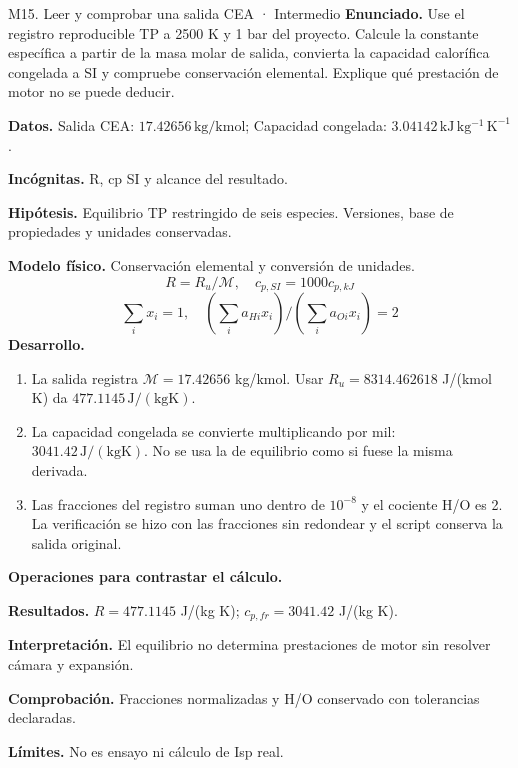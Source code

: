 \begin{studiumworked}{M15. Leer y comprobar una salida CEA · Intermedio}
\textbf{Enunciado.} Use el registro reproducible TP a 2500 K y 1 bar del proyecto. Calcule la constante específica a partir de la masa molar de salida, convierta la capacidad calorífica congelada a SI y compruebe conservación elemental. Explique qué prestación de motor no se puede deducir.

\textbf{Datos.} Salida CEA: $17.42656\,\mathrm{kg/kmol}$; Capacidad congelada: $3.04142\,\mathrm{kJ\,kg^{-1}\,K^{-1}}$.

\textbf{Incógnitas.} R, cp SI y alcance del resultado.

\textbf{Hipótesis.} Equilibrio TP restringido de seis especies. Versiones, base de propiedades y unidades conservadas.

\textbf{Modelo físico.} Conservación elemental y conversión de unidades.
\[R=R_u/\mathcal M,\quad c_{p,SI}=1000c_{p,kJ}\]
\[\sum_i x_i=1,\quad (\sum_i a_{Hi}x_i)/(\sum_i a_{Oi}x_i)=2\]
\textbf{Desarrollo.}
\begin{enumerate}
\item La salida registra $\mathcal M=17.42656$ kg/kmol. Usar $R_u=8314.462618$ J/(kmol K) da $477.1145\,\mathrm{J/(kg K)}$.
\item La capacidad congelada se convierte multiplicando por mil: $3041.42\,\mathrm{J/(kg K)}$. No se usa la de equilibrio como si fuese la misma derivada.
\item Las fracciones del registro suman uno dentro de $10^{-8}$ y el cociente H/O es 2. La verificación se hizo con las fracciones sin redondear y el script conserva la salida original.
\end{enumerate}
\textbf{Operaciones para contrastar el cálculo.}

\textbf{Resultados.} $R=477.1145$ J/(kg K); $c_{p,fr}=3041.42$ J/(kg K).

\textbf{Interpretación.} El equilibrio no determina prestaciones de motor sin resolver cámara y expansión.

\textbf{Comprobación.} Fracciones normalizadas y H/O conservado con tolerancias declaradas.

\textbf{Límites.} No es ensayo ni cálculo de Isp real.
\end{studiumworked}
